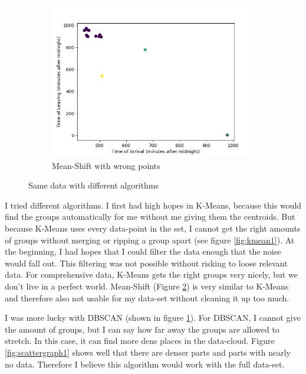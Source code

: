 \documentclass[paper=a4, fontsize=11pt]{article}
\begin{document}
\begin{figure}[H]
\begin{subfigure}[b]{0.2\linewidth}
	\label{fig:dbscan1}
  \end{subfigure}
  \begin{subfigure}[b]{0.2\linewidth}
    \includegraphics[width=\linewidth]{POC_simple_data_labels_two_wrong_point_mean-shift.png}
    \caption{Mean-Shift with wrong points}
	\label{fig:meanshift1}
  \end{subfigure}
  \caption{Same data with different algorithms}
  \label{fig:pocalgor3}
\end{figure}

I tried different algorithms. I first had high hopes in K-Means, because this would find the groups automatically for me without me giving them the centroids. But because K-Means uses every data-point in the set, I cannot get the right amounts of groups without merging or ripping a group apart (see figure \ref{fig:kmean1}). At the beginning, I had hopes that I could filter the data enough that the noise would fall out. This filtering was not possible without risking to loose relevant data. For comprehensive data, K-Means gets the right groups very nicely, but we don't live in a perfect world. Mean-Shift (Figure \ref{fig:meanshift1}) is very similar to K-Means and therefore also not usable for my data-set without cleaning it up too much. 

I was more lucky with DBSCAN (shown in figure \ref{fig:dbscan1}). For DBSCAN, I cannot give the amount of groups, but I can say how far away the groups are allowed to stretch. In this case, it can find more dens places in the data-cloud. Figure \ref{fig:scattergraph1} shows well that there are denser parts and parts with nearly no data. Therefore I believe this algorithm would work with the full data-set. 
\end{document}

